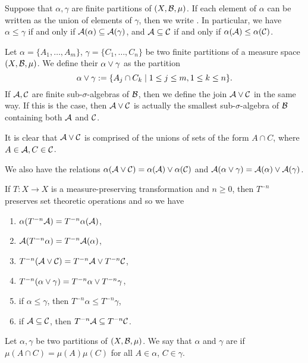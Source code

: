 \begin{definition}
	Suppose that $\alpha, \gamma$ are finite partitions of $(X, \mathcal{B}, \mu)$. If each element of $\alpha$ can be written as the union of elements of $\gamma$, then we write \key{$\alpha \leq \gamma$}. In particular, we have $\alpha \leq \gamma$ if and only if $\mathcal{A}(\alpha) \subseteq \mathcal{A}(\gamma)$, and $\mathcal{A} \subseteq \mathcal{C}$ if and only if $\alpha(\mathcal{A}) \leq \alpha(\mathcal{C})$.
\end{definition}

\begin{definition}
	Let $\alpha = \{A_1, \dots, A_m\}$, $\gamma = \{C_1, \dots, C_n\}$ be two finite partitions of a measure space $(X, \mathcal{B}, \mu)$. We define their  $\alpha \vee \gamma$ as the partition
	\[
		\alpha \vee \gamma := \{A_j \cap C_k \mid 1 \leq j \leq m, 1 \leq k \leq n\}.
	\]
	If $\mathcal{A}, \mathcal{C}$ are finite sub-$\sigma$-algebras of $\mathcal{B}$, then we define the join $\mathcal{A} \vee \mathcal{C}$ in the same way. If this is the case, then $\mathcal{A} \vee \mathcal{C}$ is actually the smallest sub-$\sigma$-algebra of $\mathcal{B}$ containing both $\mathcal{A}$ and $\mathcal{C}$.
	
	It is clear that $\mathcal{A} \vee \mathcal{C}$ is comprised of the unions of sets of the form $A \cap C$, where $A \in \mathcal{A}, C \in \mathcal{C}$.
	
	We also have the relations $\alpha(\mathcal{A} \vee \mathcal{C}) = \alpha(\mathcal{A}) \vee \alpha(\mathcal{C})$ and $\mathcal{A}(\alpha \vee \gamma) = \mathcal{A}(\alpha) \vee \mathcal{A}(\gamma)$.
\end{definition}

\begin{remark}
	If $T : X \to X$ is a measure-preserving transformation and $n \geq 0$, then $T^{-n}$ preserves set theoretic operations and so we have
	\begin{enumerate}
		\item $\alpha(T^{-n}{\mathcal{A}}) = T^{-n}{\alpha(\mathcal{A})}$,
		\item $\mathcal{A}(T^{-n}{\alpha}) = T^{-n}{\mathcal{A}(\alpha)}$,
		\item $T^{-n}(\mathcal{A} \vee \mathcal{C}) = T^{-n}{\mathcal{A}} \vee T^{-n}{\mathcal{C}}$,
		\item $T^{-n}(\alpha \vee \gamma) = T^{-n}{\alpha} \vee T^{-n}{\gamma}$,
		\item if $\alpha \leq \gamma$, then $T^{-n}{\alpha} \leq T^{-n}{\gamma}$,
		\item if $\mathcal{A} \subseteq \mathcal{C}$, then $T^{-n}{\mathcal{A}} \subseteq T^{-n}{\mathcal{C}}$.
	\end{enumerate}
\end{remark}

\begin{definition}
	Let $\alpha, \gamma$ be two partitions of $(X, \mathcal{B}, \mu)$. We say that $\alpha$ and $\gamma$ are  if $\mu(A \cap C) = \mu(A)\mu(C)$ for all $A \in \alpha$, $C \in \gamma$.
\end{definition}

